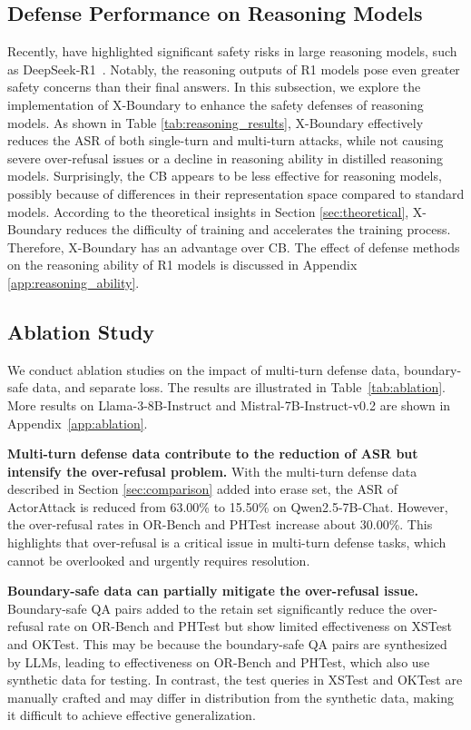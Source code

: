 \subsection{Defense Performance on Reasoning Models}
Recently, \citet{safechain,R1_assessment} have highlighted significant safety risks in large reasoning models, such as DeepSeek-R1~\cite{guo2025deepseek}.
%
Notably, the reasoning outputs of R1 models pose even greater safety concerns than their final answers.
%
In this subsection, we explore the implementation of X-Boundary to enhance the safety defenses of reasoning models.
%
As shown in Table \ref{tab:reasoning_results}, X-Boundary effectively reduces the ASR of both single-turn and multi-turn attacks, while not causing severe over-refusal issues or a decline in reasoning ability in distilled reasoning models.
%
Surprisingly, the CB appears to be less effective for reasoning models, possibly because of differences in their representation space compared to standard models.
%
According to the theoretical insights in Section \ref{sec:theoretical}, X-Boundary reduces the difficulty of training and accelerates the training process.
%
Therefore, X-Boundary has an advantage over CB.
%
The effect of defense methods on the reasoning ability of R1 models is discussed in Appendix \ref{app:reasoning_ability}.

\subsection{Ablation Study}
\label{sec:ablation}
We conduct ablation studies on the impact of multi-turn defense data, boundary-safe data, and separate loss. The results are illustrated in Table~\ref{tab:ablation}. More results on Llama-3-8B-Instruct and Mistral-7B-Instruct-v0.2 are shown in Appendix~\ref{app:ablation}.

\textbf{Multi-turn defense data contribute to the reduction of ASR but intensify the over-refusal problem.} 
%
With the multi-turn defense data described in Section \ref{sec:comparison} added into erase set, the ASR of ActorAttack is reduced from 63.00\% to 15.50\% on Qwen2.5-7B-Chat. 
%
However, the over-refusal rates in OR-Bench and PHTest increase about 30.00\%.
%
This highlights that over-refusal is a critical issue in multi-turn defense tasks, which cannot be overlooked and urgently requires resolution.

\textbf{Boundary-safe data can partially mitigate the over-refusal issue.}
%
Boundary-safe QA pairs added to the retain set significantly reduce the over-refusal rate on OR-Bench and PHTest but show limited effectiveness on XSTest and OKTest. 
%
This may be because the boundary-safe QA pairs are synthesized by LLMs, leading to effectiveness on OR-Bench and PHTest, which also use synthetic data for testing. 
%
In contrast, the test queries in XSTest and OKTest are manually crafted and may differ in distribution from the synthetic data, making it difficult to achieve effective generalization.

